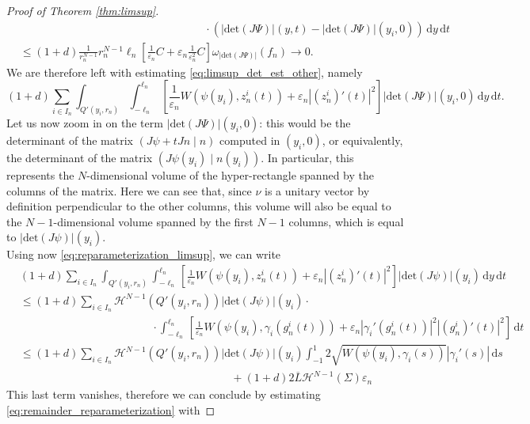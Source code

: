 \documentclass[a4paper, 11pt, reqno]{amsart}
\theoremstyle{plain}
\theoremstyle{definition}
\theoremstyle{remark}
\newcommand{\dd}{\,\mathrm{d}}
\begin{document}
\begin{proof}[Proof of Theorem \ref{thm:limsup}]
\begin{align*}
    &\hspace{7cm}\cdot\left( | \mathrm{det} (J\Psi)|(y,t) - | \mathrm{det} (J\Psi)|(y_i,0) \right) \dd y \dd t \\
    &\leq (1+d) \frac{1}{r_n^{N-1}} r_n^{N-1} \ell_n \left[ \frac{1}{\varepsilon_n} C + \varepsilon_n \frac{1}{\varepsilon_n^2} C \right] \omega_{|\mathrm{det}(J\Psi)|} (f_n) \to 0.
\end{align*}
We are therefore left with estimating \eqref{eq:limsup_det_est_other}, namely
$$ (1+d) \sum_{i \in I_n} \int_{Q'(y_i,r_n)} \int_{-\ell_n}^{\ell_n} \left[ \frac{1}{\varepsilon_n} W(\psi(y_i), z_n^i(t)) + \varepsilon_n | (z_n^i)'(t)|^2 \right] | \mathrm{det} (J\Psi)|(y_i,0) \dd y \dd t. $$
Let us now zoom in on the term $| \mathrm{det} (J\Psi) | (y_i, 0)$: this would be the determinant of the matrix $(J\psi + t Jn \;| \; n ) $ computed in $(y_i,0)$, or equivalently, the determinant of the matrix $(J \psi (y_i) \; | \; n(y_i) )$. In particular, this represents the $N$-dimensional volume of the hyper-rectangle spanned by the columns of the matrix. Here we can see that, since $\nu$ is a unitary vector by definition perpendicular to the other columns, this volume will also be equal to the $N-1$-dimensional volume spanned by the first $N-1$ columns, which is equal to $| \mathrm{det}(J\psi)|(y_i)$.\\
Using now \eqref{eq:reparameterization_limsup}, we can write
\begin{align}
    &(1+d) \sum_{i \in I_n} \int_{Q'(y_i,r_n)} \int_{-\ell_n}^{\ell_n} \left[ \frac{1}{\varepsilon_n} W(\psi(y_i), z_n^i(t)) + \varepsilon_n | (z_n^i)'(t)|^2 \right] | \mathrm{det}(J\psi)|(y_i) \dd y \dd t \nonumber \\
    &\leq (1+d) \sum_{i \in I_n} \mathcal{H}^{N-1} (Q'(y_i, r_n)) |\mathrm{det}(J\psi)|(y_i)\cdot \nonumber\\
    &\hspace{5cm}\cdot\int_{-\ell_n}^{\ell_n} \left[ \frac{1}{\varepsilon_n} W(\psi(y_i), \gamma_i(g_n^i(t))) + \varepsilon_n |\gamma_i'(g_n^i(t))|^2 |(g_n^i)'(t)|^2 \right] \dd t \nonumber \\
    &\leq (1+d) \sum_{i \in I_n} \mathcal{H}^{N-1} (Q'(y_i, r_n)) |\mathrm{det}(J\psi)|(y_i) \int_{-1}^1 2 \sqrt{W(\psi(y_i), \gamma_i(s))} | \gamma_i'(s)| \dd s \label{eq:remainder_reparameterization} \\
    &\hspace{8cm}+ (1+d) 2 \overline{L} \mathcal{H}^{N-1}(\Sigma) \varepsilon_n \nonumber
\end{align}
This last term vanishes, therefore we can conclude by estimating \eqref{eq:remainder_reparameterization} with

\end{proof}
\end{document}
